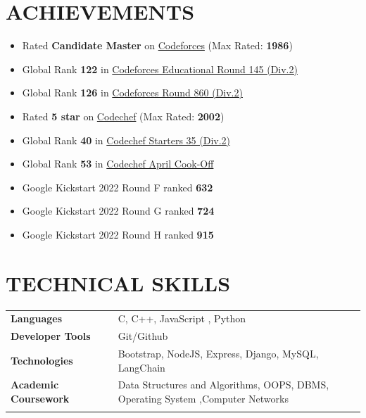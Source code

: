 \documentclass[12pt]{article}
\begin{document}
\section*{ACHIEVEMENTS}
\begin{itemize}[leftmargin=*, topsep=1pt, itemsep=1pt, partopsep=1pt, parsep=2pt]
	\item Rated \textbf{Candidate Master} on \href{https://codeforces.com/profile/Harsh_Bang_7}{Codeforces} (Max Rated: \textbf{1986})
	\item Global Rank \textbf{122} in 
\href{https://codeforces.com/contest/1809/standings/2/participant/151861802#p151861802}{Codeforces Educational Round 145 (Div.2)}
	\item Global Rank \textbf{126} in \href{https://codeforces.com/contest/1798/standings/participant/152311755#p152311755}{Codeforces Round 860 (Div.2)}
	\item Rated \textbf{5 star} on \href{https://www.codechef.com/users/harsh_bang_7}{Codechef} (Max Rated: \textbf{2002})
	\item Global Rank \textbf{40} in \href{https://www.codechef.com/rankings/START35B?itemsPerPage=100&order=asc&page=1&search=harsh_bang_7&sortBy=rank}{Codechef Starters 35 (Div.2)}
	\item Global Rank \textbf{53} in \href{https://www.codechef.com/rankings/COOK140B?itemsPerPage=100&order=asc&page=1&search=harsh_bang_7&sortBy=rank}{Codechef April Cook-Off}
	\item Google Kickstart 2022 Round F ranked \textbf{632}
	\item Google Kickstart 2022 Round G ranked \textbf{724}
	\item Google Kickstart 2022 Round H ranked \textbf{915}
\end{itemize}
\section*{TECHNICAL SKILLS}
\begin{tabular}{@{}llll}
	\textbf{Languages}               && C, C++, JavaScript , Python                                              		\\
	\textbf{Developer Tools}         && Git/Github                                               		\\
	\textbf{Technologies}            && Bootstrap, NodeJS, Express, Django, MySQL, LangChain \\
	\textbf{Academic Coursework}     && Data Structures and Algorithms, OOPS, DBMS, Operating System ,Computer Networks                                          \\
	\vspace{-\topsep}
\end{tabular}
\end{document}
